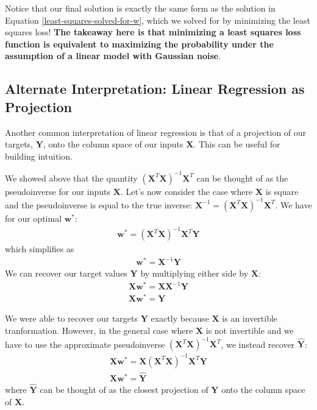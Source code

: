 Notice that our final solution is exactly the same form as the solution in Equation \ref{least-squares-solved-for-w}, which we solved for by minimizing the least squares loss! \textbf{The takeaway here is that minimizing a least squares loss function is equivalent to maximizing the probability under the assumption of a linear model with Gaussian noise}.

\subsection{Alternate Interpretation: Linear Regression as Projection}
Another common interpretation of linear regression is that of a projection of our targets, $\textbf{Y}$, onto the column space of our inputs $\textbf{X}$. This can be useful for building intuition.

We showed above that the quantity $(\textbf{X}^{T}\textbf{X})^{-1}\textbf{X}^{T}$ can be thought of as the pseudoinverse for our inputs $\textbf{X}$. Let's now consider the case where $\textbf{X}$ is square and the pseudoinverse is equal to the true inverse: $\textbf{X}^{-1} = (\textbf{X}^{T}\textbf{X})^{-1}\textbf{X}^{T}$. We have for our optimal $\textbf{w}^{*}$:
\begin{align*}
    \textbf{w}^{*} = (\textbf{X}^{T}\textbf{X})^{-1}\textbf{X}^{T}\textbf{Y}
\end{align*}
which simplifies as
\begin{align*}
    \textbf{w}^{*} = \textbf{X}^{-1}\textbf{Y}
\end{align*}
We can recover our target values $\textbf{Y}$ by multiplying either side by $\textbf{X}$:
\begin{align*}
    \textbf{X}\textbf{w}^{*} = \textbf{X}\textbf{X}^{-1}\textbf{Y} \\
    \textbf{X}\textbf{w}^{*} = \textbf{Y}
\end{align*}

We were able to recover our targets $\textbf{Y}$ exactly because $\textbf{X}$ is an invertible tranformation. However, in the general case where $\textbf{X}$ is not invertible and we have to use the approximate pseudoinverse $(\textbf{X}^{T}\textbf{X})^{-1}\textbf{X}^{T}$, we instead recover $\hat{\textbf{Y}}$:
\begin{align*}
    \textbf{X}\textbf{w}^{*} = \textbf{X}(\textbf{X}^{T}\textbf{X})^{-1}\textbf{X}^{T}\textbf{Y} \\
    \textbf{X}\textbf{w}^{*} = \hat{\textbf{Y}}
\end{align*}
where $\hat{\textbf{Y}}$ can be thought of as the closest projection of $\textbf{Y}$ onto the column space of $\textbf{X}$.

